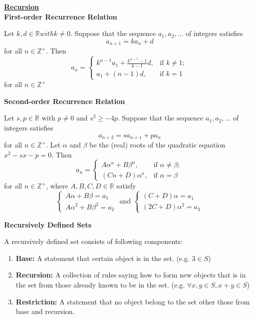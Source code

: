 \documentclass[a4paper]{article}
\newcommand{\heading}[1]{{\small\underline{\textbf{#1}}}}
\newcommand{\subheading}[1]{{\scriptsize\textbf{#1}}}
\begin{document}
\begin{multicols*}{4}
\heading{Recursion} \\

\subheading{First-order Recurrence Relation}

Let $k, d \in \mathbb{R} with k \ne 0$. Suppose that the sequence $a_1, a_2, \dots$ of integers satisfies
    $$a_{n+1} = ka_n + d$$
for all $n \in \mathbb{Z}^+$. Then
    $$a_n = \begin{cases}
    k^{n-1}a_1 + \frac{k^{n-1}-1}{k-1}d, & \text{if } k \ne 1 ;\\
    a_1 + (n-1)d, & \text{if } k = 1
    \end{cases}$$
for all $n \in \mathbb{Z}^+$

\subheading{Second-order Recurrence Relation}

Let $s, p \in \mathbb{R} \text{ with } p \ne 0 \text{ and } s^2 \geq -4p$. Suppose that the sequence $a_1, a_2, \dots$ of integers satisfies
    $$a_{n+2} = sa_{n+1} + pa_n$$
for all $n \in \mathbb{Z}^+$. Let $\alpha$ and $\beta$ be the (real) roots of the quadratic equation $x^2 - sx - p = 0$. Then
    $$a_n = \begin{cases}
    A\alpha^n + B\beta^n, & \text{if } \alpha \ne \beta;\\
    (Cn + D)\alpha^n, & \text{if } \alpha = \beta
    \end{cases}$$
for all $n \in \mathbb{Z}^+$, where $A, B, C, D \in \mathbb{R}$ satisfy
    $$
    \begin{cases}
    A\alpha + B\beta = a_1 \\
    A\alpha^2 + B\beta^2 = a_2
    \end{cases}
    \text{ and }
    \begin{cases}
    (C + D)\alpha = a_1 \\
    (2C + D)\alpha^2 = a_2
    \end{cases}
    $$
    
\subheading{Recursively Defined Sets}

A recursively defined set consists of following components:

\begin{enumerate}
	\item \textbf{Base:} A statement that certain object is in the set. (e.g. $3 \in S$)
	\item \textbf{Recursion:} A collection of rules saying how to form new objects that is in the set from those already known to be in the set. (e.g. $\forall x, y \in S, x + y \in S$)
	\item \textbf{Restriction:} A statement that no object belong to the set other those from base and recursion.
\end{enumerate}


\end{multicols*}
\end{document}
